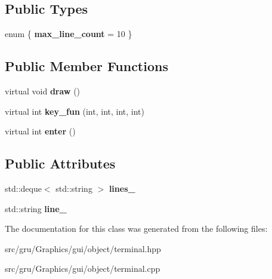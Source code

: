 \subsection*{\-Public \-Types}
\begin{DoxyCompactItemize}
\item 
enum \{ {\bfseries max\-\_\-line\-\_\-count} =  10
 \}
\end{DoxyCompactItemize}
\subsection*{\-Public \-Member \-Functions}
\begin{DoxyCompactItemize}
\item 
\hypertarget{classglutpp_1_1gui_1_1object_1_1terminal_aa6568349b7e7409360cded62433f6f58}{virtual void {\bfseries draw} ()}\label{classglutpp_1_1gui_1_1object_1_1terminal_aa6568349b7e7409360cded62433f6f58}

\item 
\hypertarget{classglutpp_1_1gui_1_1object_1_1terminal_a3d6f50eaddf7fda7ed5fb4027d1a9a5c}{virtual int {\bfseries key\-\_\-fun} (int, int, int, int)}\label{classglutpp_1_1gui_1_1object_1_1terminal_a3d6f50eaddf7fda7ed5fb4027d1a9a5c}

\item 
\hypertarget{classglutpp_1_1gui_1_1object_1_1terminal_a419430113f8d9a74d1300dc290a6d709}{virtual int {\bfseries enter} ()}\label{classglutpp_1_1gui_1_1object_1_1terminal_a419430113f8d9a74d1300dc290a6d709}

\end{DoxyCompactItemize}
\subsection*{\-Public \-Attributes}
\begin{DoxyCompactItemize}
\item 
\hypertarget{classglutpp_1_1gui_1_1object_1_1terminal_a7c39f20eb933d89385cd68cbc3fd540c}{std\-::deque$<$ std\-::string $>$ {\bfseries lines\-\_\-}}\label{classglutpp_1_1gui_1_1object_1_1terminal_a7c39f20eb933d89385cd68cbc3fd540c}

\item 
\hypertarget{classglutpp_1_1gui_1_1object_1_1terminal_ac00729aaa825f50b546ce77626c4d650}{std\-::string {\bfseries line\-\_\-}}\label{classglutpp_1_1gui_1_1object_1_1terminal_ac00729aaa825f50b546ce77626c4d650}

\end{DoxyCompactItemize}


\-The documentation for this class was generated from the following files\-:\begin{DoxyCompactItemize}
\item 
src/gru/\-Graphics/gui/object/terminal.\-hpp\item 
src/gru/\-Graphics/gui/object/terminal.\-cpp\end{DoxyCompactItemize}
